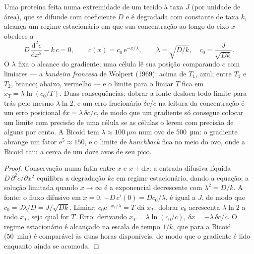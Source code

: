 \begin{theorem}\label{thm:b3:developmental-genetics:gradient}
Uma proteína feita numa extremidade de um tecido à taxa $J$ (por unidade
de área), que se difunde com coeficiente $D$ e é degradada com constante
de taxa $k$, alcança um regime estacionário em que sua concentração ao
longo do eixo $x$ obedece a
\[
D\,\frac{\mathrm{d}^{2}c}{\mathrm{d}x^{2}} - k\,c = 0,
\qquad c(x) = c_{0}\,\mathrm{e}^{-x/\lambda}, \qquad \lambda = \sqrt{D/k},
\quad c_{0} = \frac{J}{\sqrt{Dk}} .
\]
O \emph{} $\lambda$ fixa o alcance do
gradiente; uma célula lê sua posição comparando $c$ com limiares --- a
\emph{bandeira francesa} de Wolpert (1969): acima de $T_{1}$, azul;
entre $T_{1}$ e $T_{2}$, branco; abaixo, vermelho --- e o limite para o
limiar $T$ fica em $x_{T} = \lambda\ln(c_{0}/T)$. Duas consequências:
dobrar a fonte desloca todo limite para trás pelo mesmo $\lambda\ln 2$,
e um erro fracionário $\delta c/c$ na leitura da concentração é um erro
posicional $\delta x = \lambda\,\delta c/c$, de modo que um gradiente só
consegue colocar um limite com precisão de uma célula se as células o
lerem com precisão de alguns por cento. A Bicoid tem $\lambda \approx \qty{100}{\micro m}$ num ovo de \qty{500}{\micro m}: o gradiente abrange
um fator $\mathrm{e}^{5}
\approx 150$, e o limite de \emph{hunchback}
fica no meio do ovo, onde a Bicoid caiu a cerca de um doze avos de seu
pico.
\end{theorem}
\begin{proof}
Conservação numa fatia entre $x$ e $x + \mathrm{d}x$: a entrada difusiva
líquida $D\,\partial^{2}c/\partial x^{2}$ equilibra a degradação $kc$ em
regime estacionário, dando a equação; a solução limitada quando $x \to \infty$ é a exponencial decrescente com $\lambda^{2} = D/k$. A fonte: o
fluxo difusivo em $x = 0$, $-D\,
c'(0) = Dc_{0}/\lambda$, é igual a $J$,
de modo que $c_{0} = J\lambda/D =
J/\sqrt{Dk}$. Limiar:
$c_{0}\mathrm{e}^{-x_{T}/\lambda} = T$ dá $x_{T}$; dobrar $c_{0}$
acrescenta $\lambda\ln 2$ a todo $x_{T}$, seja qual for $T$. Erro:
derivando $x_{T} = \lambda\ln(c_{0}/c)$, $\delta x = -\lambda\,\delta c/c$. O regime estacionário é alcançado na escala de tempo $1/k$, que
para a Bicoid (\qty{50}{min}) é comparável às duas horas disponíveis, de
modo que o gradiente é lido enquanto ainda se acomoda.
\end{proof}

